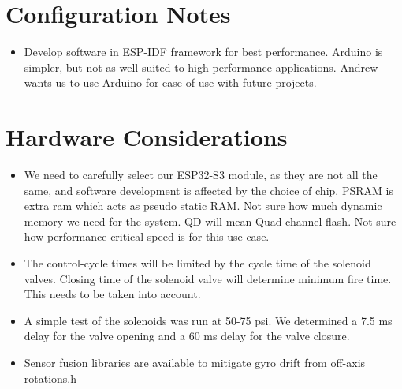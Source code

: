\documentclass[11pt]{scrartcl}
\begin{document}

	
\section{Configuration Notes}

\begin{itemize}
	\item Develop software in ESP-IDF framework for best performance. Arduino is simpler, but not as well suited to high-performance applications. Andrew wants us to use Arduino for ease-of-use with future projects.
\end{itemize}

\section{Hardware Considerations}

\begin{itemize}
	\item We need to carefully select our ESP32-S3 module, as they are not all the same, and software development is affected by the choice of chip. PSRAM is extra ram which acts as pseudo static RAM. Not sure how much dynamic memory we need for the system. QD will mean Quad channel flash. Not sure how performance critical speed is for this use case.
	\item The control-cycle times will be limited by the cycle time of the solenoid valves. Closing time of the solenoid valve will determine minimum fire time. This needs to be taken into account.
	\item A simple test of the solenoids was run at 50-75 psi. We determined a 7.5 ms delay for the valve opening and a 60 ms delay for the valve closure. %
	\item Sensor fusion libraries are available to mitigate gyro drift from off-axis rotations.h
	
\end{itemize}
\end{document}
